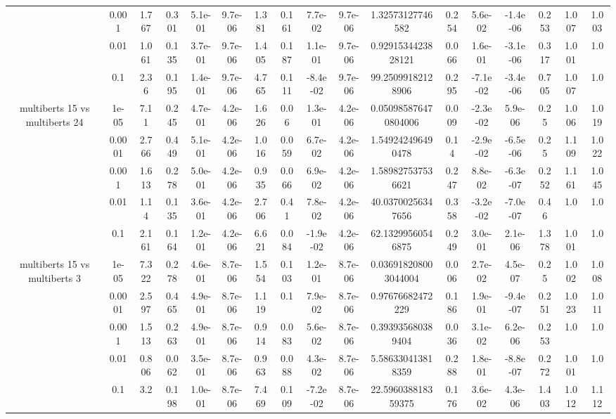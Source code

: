 \begin{tabular}{|c|c|c|c|c|c|c|c|c|c|c|c|c|c|c|c|c|}
 & 0.001 & 1.767 & 0.301 & 5.1e-01 & 9.7e-06 & 1.381 & 0.161 & 7.7e-02 & 9.7e-06 & 1.32573127746582 & 0.254 & 5.6e-02 & -1.4e-06 & 0.253 & 1.007 & 1.003 \\
 & 0.01 & 1.061 & 0.135 & 3.7e-01 & 9.7e-06 & 1.405 & 0.187 & 1.1e-01 & 9.7e-06 & 0.9291534423828121 & 0.066 & 1.6e-01 & -3.1e-06 & 0.317 & 1.001 & 1.0 \\
 & 0.1 & 2.36 & 0.195 & 1.4e-01 & 9.7e-06 & 4.765 & 0.111 & -8.4e-02 & 9.7e-06 & 99.25099182128906 & 0.295 & -7.1e-02 & -3.4e-06 & 0.705 & 1.007 & 1.0 \\
\hline
\multirow{5}{*}{multiberts 15 vs multiberts 24} & 1e-05 & 7.11 & 0.245 & 4.7e-01 & 4.2e-06 & 1.626 & 0.06 & 1.3e-01 & 4.2e-06 & 0.050985876470804006 & 0.009 & -2.3e-02 & 5.9e-06 & 0.25 & 1.006 & 1.019 \\
 & 0.0001 & 2.766 & 0.449 & 5.1e-01 & 4.2e-06 & 1.016 & 0.059 & 6.7e-02 & 4.2e-06 & 1.549242496490478 & 0.14 & -2.9e-02 & -6.5e-06 & 0.25 & 1.109 & 1.022 \\
 & 0.001 & 1.613 & 0.278 & 5.0e-01 & 4.2e-06 & 0.935 & 0.066 & 6.9e-02 & 4.2e-06 & 1.589827537536621 & 0.247 & 8.8e-02 & -6.3e-07 & 0.252 & 1.161 & 1.045 \\
 & 0.01 & 1.14 & 0.135 & 3.6e-01 & 4.2e-06 & 2.706 & 0.41 & 7.8e-02 & 4.2e-06 & 40.03700256347656 & 0.358 & -3.2e-02 & -7.0e-07 & 0.46 & 1.0 & 1.0 \\
 & 0.1 & 2.161 & 0.164 & 1.2e-01 & 4.2e-06 & 6.621 & 0.084 & -1.9e-02 & 4.2e-06 & 62.13299560546875 & 0.249 & 3.0e-01 & 2.1e-06 & 1.378 & 1.001 & 1.0 \\
\hline
\multirow{5}{*}{multiberts 15 vs multiberts 3} & 1e-05 & 7.322 & 0.278 & 4.6e-01 & 8.7e-06 & 1.554 & 0.103 & 1.2e-01 & 8.7e-06 & 0.036918208003044004 & 0.006 & 2.7e-02 & 4.5e-07 & 0.25 & 1.002 & 1.008 \\
 & 0.0001 & 2.597 & 0.465 & 4.9e-01 & 8.7e-06 & 1.119 & 0.1 & 7.9e-02 & 8.7e-06 & 0.97676682472229 & 0.186 & 1.9e-01 & -9.4e-07 & 0.251 & 1.023 & 1.011 \\
 & 0.001 & 1.513 & 0.263 & 4.9e-01 & 8.7e-06 & 0.914 & 0.083 & 5.6e-02 & 8.7e-06 & 0.393935680389404 & 0.036 & 3.1e-02 & 6.2e-06 & 0.253 & 1.0 & 1.0 \\
 & 0.01 & 0.806 & 0.062 & 3.5e-01 & 8.7e-06 & 0.963 & 0.088 & 4.3e-02 & 8.7e-06 & 5.586330413818359 & 0.288 & 1.8e-01 & -8.8e-07 & 0.272 & 1.001 & 1.0 \\
 & 0.1 & 3.2 & 0.198 & 1.0e-01 & 8.7e-06 & 7.469 & 0.109 & -7.2e-02 & 8.7e-06 & 22.596038818359375 & 0.176 & 3.6e-02 & 4.3e-06 & 1.403 & 1.012 & 1.112 \\

\end{tabular}
